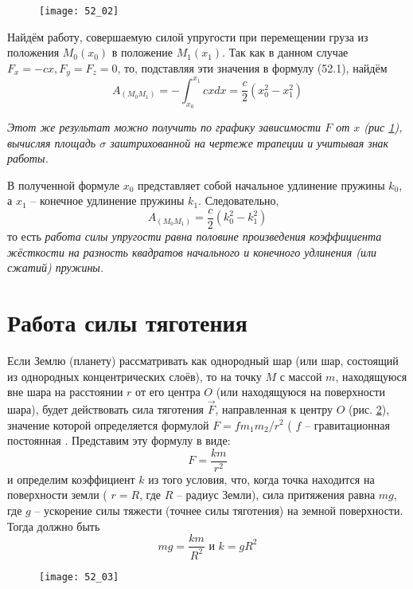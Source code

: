 \begin{figure}[h!]
    \texttt{[image: 52\_02]}\hfill
    \parbox{.47\textwidth}{\caption{} \label{pic52_02}}
\end{figure}

Найдём работу, совершаемую силой упругости при перемещении груза из 
положения \( M_0(x_0) \) в положение \( M_1(x_1) \). Так как в данном 
случае \( F_x = -cx, F_y = F_z = 0 \), то, подставляя эти значения в 
формулу (52.1), найдём
\[ 
    A_{(M_0 M_1)} = - \int_{x_0}^{x_1} cxdx = 
    \frac{c}{2} \left( x^{2}_0 - x^{2}_1 \right) 
\]

\emph{Этот же результат можно получить по графику зависимости 
\( F \) от \( x \) (рис \ref{pic52_02}), вычисляя площадь \( \sigma \) 
заштрихованной на чертеже трапеции и учитывая знак работы.}

В полученной формуле \( x_0 \) представляет собой начальное удлинение 
пружины \( k_0 \), а \( x_1 \) -- конечное удлинение пружины \( k_1 \). 
Следовательно, 
\[ A_{(M_0 M_1)} = \frac{c}{2} \left( k^{2}_0 - k^{2}_1 \right) \]
то есть \emph{работа силы упругости равна половине произведения 
коэффициента жёсткости на разность квадратов начального и конечного 
удлинения (или сжатий) пружины.}

\section{Работа силы тяготения}
Если Землю (планету) рассматривать как однородный шар (или шар, 
состоящий из однородных концентрических слоёв), то на точку \( M \) с 
массой \( m \), находящуюся вне шара на расстоянии \( r \) от его 
центра \( O \) (или находящуюся на поверхности шара), будет действовать 
сила тяготения \( \vec{F} \), направленная к центру \( O \) (рис. \ref{pic52_03}), 
значение которой определяется формулой \( F = fm_1 m_2 / r^2 \) 
( \( f \) -- гравитационная постоянная \). Представим эту формулу в виде: 
\[ F = \frac{km}{r^2} \]
и определим коэффициент \( k \) из того условия, что, когда точка 
находится на поверхности земли ( \( r = R \), где \( R \) -- радиус Земли), 
сила притяжения равна \( mg \), где \( g \) -- ускорение силы тяжести 
(точнее силы тяготения) на земной поверхности. Тогда должно быть
\[ mg = \frac{km}{R^2} \text{ и } k = gR^2 \]

\begin{figure}[h!]
    \texttt{[image: 52\_03]}\hfill
    \parbox{.47\textwidth}{\caption{} \label{pic52_03}}
\end{figure}

